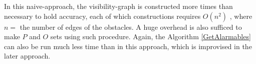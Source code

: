 In this naive-approach, the visibility-graph is constructed more times than necessary to hold accuracy, each of which constructions requires $O(n^2)$ \cite{mur}, where $n =$ the number of edges of the obstacles. A huge overhead is also sufficed to make $P$ and $O$ sets using such procedure. Again, the Algorithm \ref{GetAlarmables} can also be run much less time than in this approach, which is improvised in the later approach.





